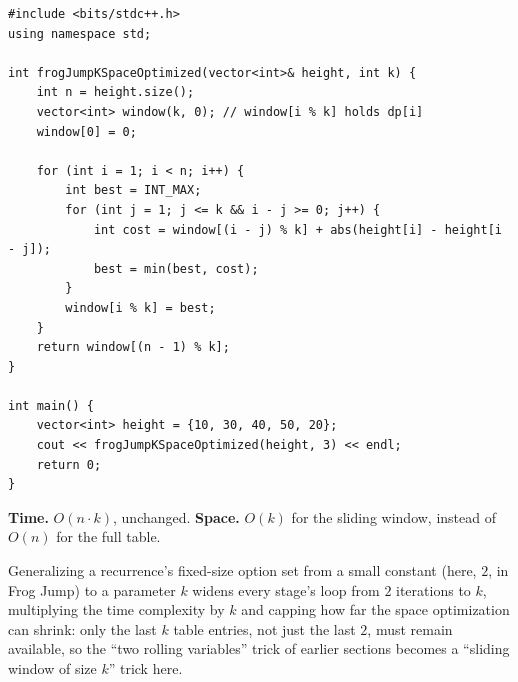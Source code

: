 \begin{lstlisting}
#include <bits/stdc++.h>
using namespace std;

int frogJumpKSpaceOptimized(vector<int>& height, int k) {
    int n = height.size();
    vector<int> window(k, 0); // window[i % k] holds dp[i]
    window[0] = 0;

    for (int i = 1; i < n; i++) {
        int best = INT_MAX;
        for (int j = 1; j <= k && i - j >= 0; j++) {
            int cost = window[(i - j) % k] + abs(height[i] - height[i - j]);
            best = min(best, cost);
        }
        window[i % k] = best;
    }
    return window[(n - 1) % k];
}

int main() {
    vector<int> height = {10, 30, 40, 50, 20};
    cout << frogJumpKSpaceOptimized(height, 3) << endl;
    return 0;
}
\end{lstlisting}

\begin{complexitybox}
\textbf{Time.} $O(n \cdot k)$, unchanged.
\textbf{Space.} $O(k)$ for the sliding window, instead of $O(n)$ for
the full table.
\end{complexitybox}

\begin{takeawaybox}
Generalizing a recurrence's fixed-size option set from a small constant
(here, $2$, in Frog Jump) to a parameter $k$ widens every stage's loop
from $2$ iterations to $k$, multiplying the time complexity by $k$ and
capping how far the space optimization can shrink: only the last $k$
table entries, not just the last $2$, must remain available, so the
``two rolling variables'' trick of earlier sections becomes a
``sliding window of size $k$'' trick here.
\end{takeawaybox}

